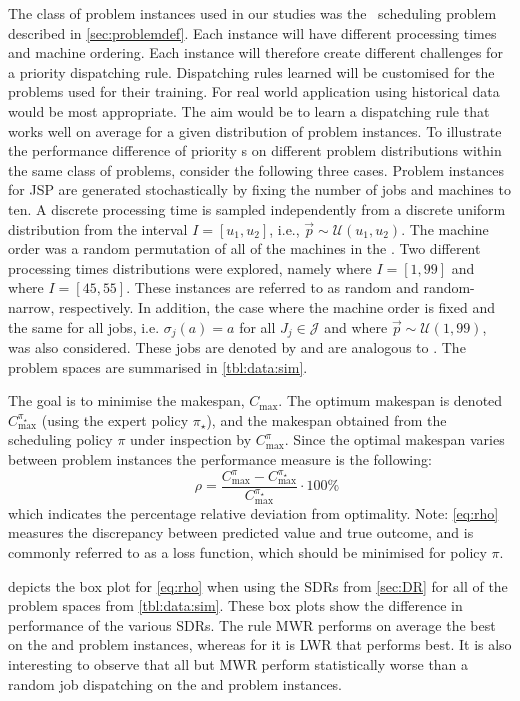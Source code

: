 \documentclass[twocolumn]{svjour3}
\begin{document}
The class of problem instances used in our studies was the \jsp\ scheduling 
problem described in \cref{sec:problemdef}. Each instance will have 
different processing times and machine ordering. Each instance will 
therefore create different challenges for a priority dispatching rule. 
Dispatching rules learned will be customised for the problems used for their 
training. For real world application using historical data would be most 
appropriate. The aim would be to learn a dispatching rule that works well on 
average for a given distribution of problem instances. 
To illustrate the performance difference of priority \dr s on different 
problem distributions within the same class of problems, 
consider the following three cases.
Problem instances for JSP are generated stochastically by fixing the number of 
jobs and machines to ten. A discrete processing time is sampled independently 
from a discrete uniform distribution from the interval $I=[u_1,u_2]$, i.e., 
$\vec{p}\sim \mathcal{U}(u_1,u_2)$. 
The machine order was a random permutation of all of the machines in the 
\jsp. Two different processing times distributions were explored, namely 
 where $I=[1,99]$ and  where $I=[45,55]$. These 
instances are referred to as random and random-narrow, respectively. 
In addition, the case where the machine order is fixed and the same for 
all jobs, i.e. $\sigma_j(a)=a$ for all $J_j\in\mathcal{J}$ and where 
$\vec{p}\sim\mathcal{U}(1,99)$, was also considered. 
These jobs are denoted by  and are analogous to .
The problem spaces are summarised in \cref{tbl:data:sim}.

The goal is to minimise the makespan, $C_{\max}$. The optimum 
makespan is denoted $C_{\max}^{\pi_\star}$ (using the expert policy 
$\pi_\star$), and the makespan obtained from the 
scheduling policy $\pi$ under inspection by $C_{\max}^{\pi}$. Since the optimal 
makespan varies between problem instances the performance measure is the 
following:
\begin{equation}\quad\label{eq:rho}
\rho=\frac{C_{\max}^{\pi}-C_{\max}^{\pi_\star}}{C_{\max}^{\pi_\star}}\cdot
100\%
\end{equation}
which indicates the percentage relative deviation from optimality. 
Note: \cref{eq:rho} measures the discrepancy between predicted value and true 
outcome, and is commonly referred to as a loss function, which should be 
minimised for policy $\pi$.

 depicts the box plot for \cref{eq:rho} when using the 
SDRs from \cref{sec:DR} for all of the problem spaces from \cref{tbl:data:sim}.
These box plots show the difference in performance of the various SDRs. The 
rule MWR performs on average the best on the  and  
problem instances, whereas for  it is LWR that performs best. It is 
also interesting to observe that all but MWR perform statistically worse than a 
random job dispatching on the  and  problem instances.
\end{document}
